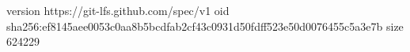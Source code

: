 version https://git-lfs.github.com/spec/v1
oid sha256:ef8145aee0053c0aa8b5bcdfab2cf43c0931d50fdff523e50d0076455c5a3e7b
size 624229
